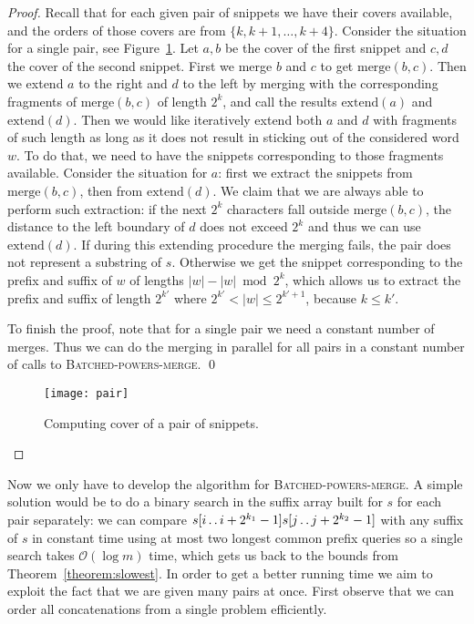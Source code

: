 \documentclass[runningheads]{llncs}
\newcommand{\twodots}{\mathinner{\ldotp\ldotp}}
\newcommand{\proc}[1]{\textnormal{\scshape#1}}
\begin{document}
\begin{proof}
Recall that for each given pair of snippets we have their covers available, and the orders of those covers are from $\{k,k+1,\ldots,k+4\}$. Consider the situation for a single pair, see Figure~\ref{figure:merging pair}. Let $a,b$ be the cover of the first snippet and $c,d$ the cover of the second snippet. First we merge $b$ and $c$ to get $\text{merge}(b,c)$. Then we extend $a$ to the right and $d$ to the left by merging with the corresponding fragments of $\text{merge}(b,c)$ of length $2^k$, and call the results $\text{extend}(a)$ and $\text{extend}(d)$. Then we would like iteratively extend both $a$ and $d$ with fragments of such length as long as it does not result in sticking out of the considered word $w$. To do that, we need to have the snippets corresponding to those fragments available. Consider the situation for $a$: first we extract the snippets from $\text{merge}(b,c)$, then from $\text{extend}(d)$. We claim that we are always able to perform such extraction: if the next $2^k$ characters fall outside $\text{merge}(b,c)$, the distance to the left boundary of $d$ does not exceed $2^k$ and thus we can use $\text{extend}(d)$. If during this extending procedure the merging fails, the pair does not represent a substring of $s$. Otherwise we get the snippet corresponding to the prefix and suffix of $w$ of lengths $|w|-|w|\bmod 2^k$, which allows us to extract the prefix and suffix of length $2^{k'}$ where $2^{k'}<|w|\leq 2^{k'+1}$, because $k\leq k'$. 

To finish the proof, note that for a single pair we need a constant number of merges. Thus we can do the merging in parallel for all pairs in a constant number of calls to \proc{Batched-powers-merge}.
\qed
\begin{figure}
\centering
\texttt{[image: pair]}
\caption{Computing cover of a pair of snippets.}
\label{figure:merging pair}
\end{figure}	
\end{proof}

Now we only have to develop the algorithm for \proc{Batched-powers-merge}. A simple solution would be to do a binary search in the suffix array built for $s$ for each pair separately: we can compare $s[i\twodots i+2^{k_1}-1] s[j\twodots j+2^{k_2}-1]$ with any suffix of $s$ in constant time using at most two longest common prefix queries so a single search takes $\mathcal{O}(\log m)$ time, which gets us back to the bounds from Theorem~\ref{theorem:slowest}. In order to get a better running time we aim to exploit the fact that we are given many pairs at once. First observe that we can order all concatenations from a single problem efficiently.
\end{document}
